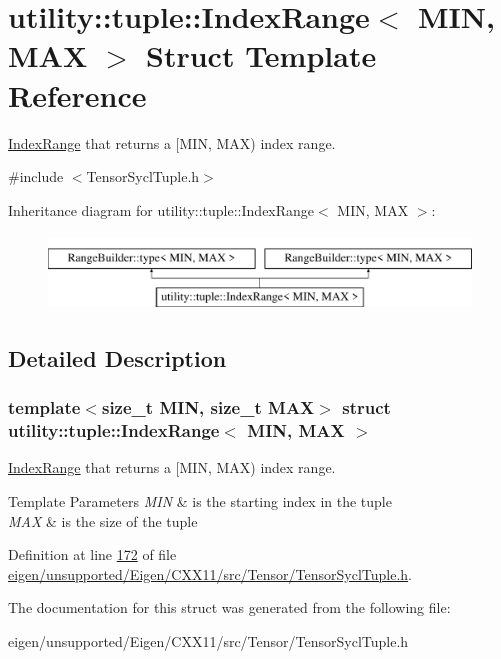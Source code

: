 \hypertarget{structutility_1_1tuple_1_1_index_range}{}\section{utility\+:\+:tuple\+:\+:Index\+Range$<$ M\+IN, M\+AX $>$ Struct Template Reference}
\label{structutility_1_1tuple_1_1_index_range}


\hyperlink{structutility_1_1tuple_1_1_index_range}{Index\+Range} that returns a \mbox{[}M\+IN, M\+AX) index range.  




{\ttfamily \#include $<$Tensor\+Sycl\+Tuple.\+h$>$}

Inheritance diagram for utility\+:\+:tuple\+:\+:Index\+Range$<$ M\+IN, M\+AX $>$\+:\begin{figure}[H]
\begin{center}
\leavevmode
\includegraphics[height=2.000000cm]{structutility_1_1tuple_1_1_index_range}
\end{center}
\end{figure}


\subsection{Detailed Description}
\subsubsection*{template$<$size\+\_\+t M\+IN, size\+\_\+t M\+AX$>$\newline
struct utility\+::tuple\+::\+Index\+Range$<$ M\+I\+N, M\+A\+X $>$}

\hyperlink{structutility_1_1tuple_1_1_index_range}{Index\+Range} that returns a \mbox{[}M\+IN, M\+AX) index range. 


\begin{DoxyTemplParams}{Template Parameters}
{\em M\+IN} & is the starting index in the tuple \\
\hline
{\em M\+AX} & is the size of the tuple \\
\hline
\end{DoxyTemplParams}


Definition at line \hyperlink{eigen_2unsupported_2_eigen_2_c_x_x11_2src_2_tensor_2_tensor_sycl_tuple_8h_source_l00172}{172} of file \hyperlink{eigen_2unsupported_2_eigen_2_c_x_x11_2src_2_tensor_2_tensor_sycl_tuple_8h_source}{eigen/unsupported/\+Eigen/\+C\+X\+X11/src/\+Tensor/\+Tensor\+Sycl\+Tuple.\+h}.



The documentation for this struct was generated from the following file\+:\begin{DoxyCompactItemize}
\item 
eigen/unsupported/\+Eigen/\+C\+X\+X11/src/\+Tensor/\+Tensor\+Sycl\+Tuple.\+h\end{DoxyCompactItemize}
